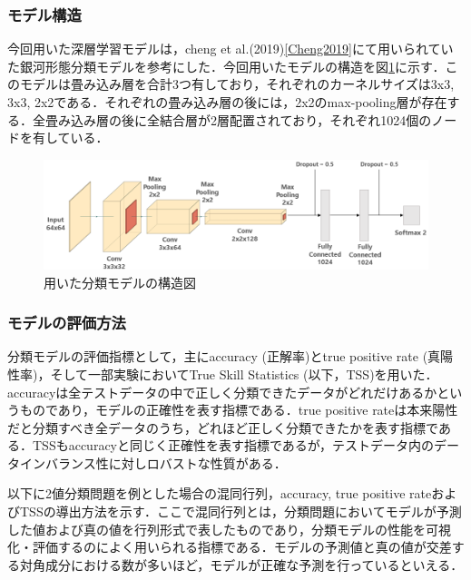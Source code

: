 \documentclass[a4j, 11pt]{jreport}
\begin{document}
\subsubsection{モデル構造}
今回用いた深層学習モデルは，cheng et al.(2019)\ref{Cheng2019}にて用いられていた銀河形態分類モデルを参考にした．今回用いたモデルの構造を図\ref{fig:model_shape}に示す．このモデルは畳み込み層を合計3つ有しており，それぞれのカーネルサイズは3x3, 3x3, 2x2である．それぞれの畳み込み層の後には，2x2のmax-pooling層が存在する．全畳み込み層の後に全結合層が2層配置されており，それぞれ1024個のノードを有している．

\begin{figure}[h]
	\centering
	\includegraphics[width=14cm]{images/model_shape.png}
	\caption{用いた分類モデルの構造図}
	\label{fig:model_shape}
\end{figure}
 
\subsubsection{モデルの評価方法}
分類モデルの評価指標として，主にaccuracy (正解率)とtrue positive rate (真陽性率)，そして一部実験においてTrue Skill Statistics (以下，TSS)を用いた．accuracyは全テストデータの中で正しく分類できたデータがどれだけあるかというものであり，モデルの正確性を表す指標である．true positive rateは本来陽性だと分類すべき全データのうち，どれほど正しく分類できたかを表す指標である．TSSもaccuracyと同じく正確性を表す指標であるが，テストデータ内のデータインバランス性に対しロバストな性質がある．

以下に2値分類問題を例とした場合の混同行列，accuracy, true positive rateおよびTSSの導出方法を示す．ここで混同行列とは，分類問題においてモデルが予測した値および真の値を行列形式で表したものであり，分類モデルの性能を可視化・評価するのによく用いられる指標である．モデルの予測値と真の値が交差する対角成分における数が多いほど，モデルが正確な予測を行っているといえる．
\end{document}
